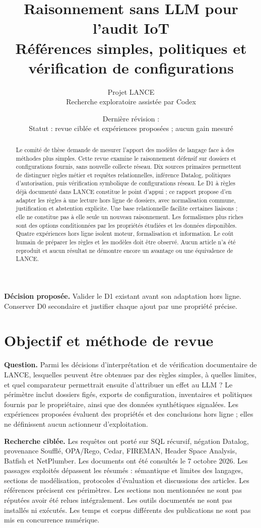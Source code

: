 \documentclass[11pt,a4paper]{article}
\title{Raisonnement sans LLM pour l'audit IoT\\
\large Références simples, politiques et vérification de configurations}
\author{Projet LANCE\\\small Recherche exploratoire assistée par Codex}
\date{\small Dernière révision : \revision\\[3pt]
Statut : revue ciblée et expériences proposées ; aucun gain mesuré}
\begin{document}
\maketitle
\begin{abstract}
Le comité de thèse demande de mesurer l'apport des modèles de langage face à
des méthodes plus simples. Cette revue examine le raisonnement défensif sur
dossiers et configurations fournis, sans nouvelle collecte réseau. Dix sources
primaires permettent de distinguer règles métier et requêtes relationnelles,
inférence Datalog, politiques d'autorisation, puis vérification symbolique de
configurations réseau. Le D1 à règles déjà documenté dans LANCE constitue le
point d'appui ; ce rapport propose d'en adapter les règles à une lecture hors
ligne de dossiers, avec normalisation commune, justification et abstention
explicite. Une base relationnelle facilite certaines liaisons ;
elle ne constitue pas à elle seule un nouveau raisonnement. Les formalismes
plus riches sont des options conditionnées par les propriétés étudiées et les
données disponibles. Quatre expériences hors ligne isolent moteur, formalisation
et information. Le coût humain de préparer les règles et les modèles doit être
observé. Aucun article n'a été reproduit et aucun résultat ne démontre encore
un avantage ou une équivalence de LANCE.
\end{abstract}
\tableofcontents
\bigskip
\noindent\textbf{Décision proposée.} Valider le D1 existant avant son adaptation
hors ligne. Conserver D0 secondaire et justifier chaque ajout par une propriété précise.

\section{Objectif et méthode de revue}
\textbf{Question.} Parmi les décisions d'interprétation et de vérification
documentaire de LANCE, lesquelles peuvent être obtenues par des règles simples,
à quelles limites, et quel comparateur permettrait ensuite d'attribuer un effet
au LLM ? Le périmètre inclut dossiers figés, exports de configuration, inventaires
et politiques fournis par le propriétaire, ainsi que des données synthétiques
signalées. Les expériences proposées évaluent des propriétés et des conclusions
hors ligne ; elles ne définissent aucun actionneur d'exploitation.

\textbf{Recherche ciblée.} Les requêtes ont porté sur SQL récursif, négation
Datalog, provenance Soufflé, OPA/Rego, Cedar, FIREMAN, Header Space Analysis,
Batfish et NetPlumber. Les documents ont été consultés le 7 octobre 2026.
Les passages exploités dépassent les résumés : sémantique et limites des langages,
sections de modélisation, protocoles d'évaluation et discussions des articles.
Les références précisent ces périmètres. Les sections non mentionnées ne sont
pas réputées avoir été relues intégralement. Les outils documentés ne sont pas
installés ni exécutés. Les temps et corpus différents des publications ne sont
pas mis en concurrence numérique.
\end{document}
